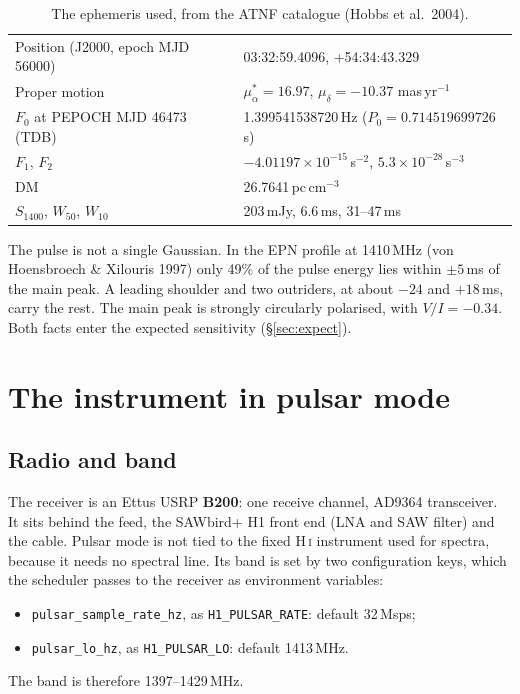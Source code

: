 \documentclass[11pt,a4paper]{article}
\newcommand{\code}[1]{\texttt{#1}}
\begin{document}
\begin{table}[h]
\centering
\begin{tabular}{@{}ll@{}}
\toprule
Position (J2000, epoch MJD 56000) & 03:32:59.4096, +54:34:43.329 \\
Proper motion & $\mu_\alpha^* = 16.97$, $\mu_\delta = -10.37$ mas\,yr$^{-1}$ \\
$F_0$ at PEPOCH MJD 46473 (TDB) & 1.399541538720\,Hz ($P_0 = 0.714519699726$\,s) \\
$F_1$, $F_2$ & $-4.01197\times10^{-15}$\,s$^{-2}$, $5.3\times10^{-28}$\,s$^{-3}$ \\
DM & 26.7641\,pc\,cm$^{-3}$ \\
$S_{1400}$, $W_{50}$, $W_{10}$ & 203\,mJy, 6.6\,ms, 31--47\,ms \\
\bottomrule
\end{tabular}
\caption{The ephemeris used, from the ATNF catalogue (Hobbs et al.\ 2004).}
\end{table}

The pulse is not a single Gaussian. In the EPN profile at 1410\,MHz (von Hoensbroech \& Xilouris 1997) only 49\% of the pulse energy lies within $\pm5$\,ms of the main peak. A leading shoulder and two outriders, at about $-24$ and $+18$\,ms, carry the rest. The main peak is strongly circularly polarised, with $V/I = -0.34$. Both facts enter the expected sensitivity (\S\ref{sec:expect}).

\section{The instrument in pulsar mode}

\subsection{Radio and band}
The receiver is an Ettus USRP \textbf{B200}: one receive channel, AD9364 transceiver. It sits behind the feed, the SAWbird+ H1 front end (LNA and SAW filter) and the cable. Pulsar mode is not tied to the fixed H\,\textsc{i} instrument used for spectra, because it needs no spectral line. Its band is set by two configuration keys, which the scheduler passes to the receiver as environment variables:
\begin{itemize}
\item \code{pulsar\_sample\_rate\_hz}, as \code{H1\_PULSAR\_RATE}: default 32\,Msps;
\item \code{pulsar\_lo\_hz}, as \code{H1\_PULSAR\_LO}: default 1413\,MHz.
\end{itemize}
The band is therefore 1397--1429\,MHz.
\end{document}
